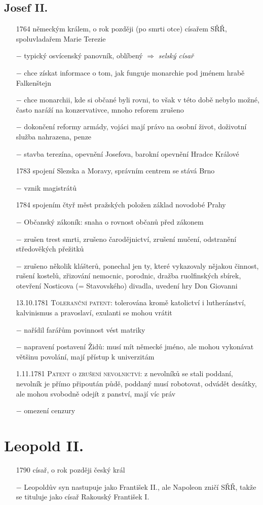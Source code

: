 \documentclass{article}
\begin{document}
\subsection*{Josef II.}
\begin{itemize}
    \vspace{-0.5em}
    \setlength\itemsep{0.15em}
    \item[1764] německým králem, o rok později (po smrti otce) císařem SŘŘ, spoluvladařem Marie Terezie
    \item[$-$] typický osvícenský panovník, oblíbený $\Rightarrow$ \textit{selský císař}
    \item[$-$] chce získat informace o tom, jak funguje monarchie pod jménem hrabě Falkenštejn
    \item[$-$] chce monarchii, kde si občané byli rovni, to však v této době nebylo možné, často naráží na konzervativce, mnoho reforem zrušeno
    \item[$-$] dokončení reformy armády, vojáci mají právo na osobní život, doživotní služba nahrazena, penze
    \item[$-$] stavba terezína, opevnění Josefova, barokní opevnění Hradce Králové
    \item[1783] spojení Slezska a Moravy, správním centrem se stává Brno
    \item[$-$] vznik magistrátů
    \item[1784] spojením čtyř měst pražských položen základ novodobé Prahy
    \item[$-$] Občanský zákoník: snaha o rovnost občanů před zákonem
    \item[$-$] zrušen trest smrti, zrušeno čarodějnictví, zrušení mučení, odstranění středověkých přežitků
    \item[$-$] zrušeno několik klášterů, ponechal jen ty, které vykazovaly nějakou činnost, rušení kostelů, zřizování nemocnic, porodnic, dražba ruolfinských sbírek, otevření Nosticova (= Stavovského) divadla, uvedení hry Don Giovanni
    \item[13.10.1781] \textsc{Toleranční patent}: tolerována kromě katolictví i lutheránství, kalvinismus a pravoslaví, exulanti se mohou vrátit
    \item[$-$] nařídil farářům povinnost vést matriky
    \item[$-$] napravení postavení Židů: musí mít německé jméno, ale mohou vykonávat většinu povolání, mají přístup k univerzitám
    \item[1.11.1781] \textsc{Patent o zrušení nevolnictví}: z nevolníků se stali poddaní, nevolník je přímo připoután půdě, poddaný musí robotovat, odvádět desátky, ale mohou svobodně odejít z panství, mají víc práv
    \item[$-$] omezení cenzury
\end{itemize}


\section*{Leopold II.}
\begin{itemize}
    \vspace{-0.5em}
    \setlength\itemsep{0.15em}
    \item[1790] císař, o rok později český král
    \item[$-$] Leopoldův syn nastupuje jako František II., ale Napoleon zničí SŘŘ, takže se tituluje jako císař Rakouský František I.
\end{itemize}
\end{document}
